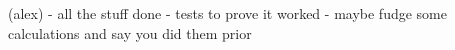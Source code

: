 \color{red}
(alex)
- all the stuff done
- tests to prove it worked  
- maybe fudge some calculations and say you did them prior
\color{black}